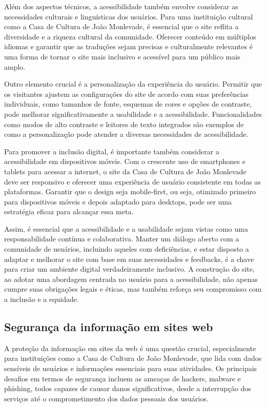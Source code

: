 Além dos aspectos técnicos, a acessibilidade também envolve considerar as necessidades culturais e linguísticas dos usuários. Para uma instituição cultural como a Casa de Cultura de João Monlevade, é essencial que o site reflita a diversidade e a riqueza cultural da comunidade. Oferecer conteúdo em múltiplos idiomas e garantir que as traduções sejam precisas e culturalmente relevantes é uma forma de tornar o site mais inclusivo e acessível para um público mais amplo.

Outro elemento crucial é a personalização da experiência do usuário. Permitir que os visitantes ajustem as configurações do site de acordo com suas preferências individuais, como tamanhos de fonte, esquemas de cores e opções de contraste, pode melhorar significativamente a usabilidade e a acessibilidade. Funcionalidades como modos de alto contraste e leitores de texto integrados são exemplos de como a personalização pode atender a diversas necessidades de acessibilidade.

Para promover a inclusão digital, é importante também considerar a acessibilidade em dispositivos móveis. Com o crescente uso de smartphones e tablets para acessar a internet, o site da Casa de Cultura de João Monlevade deve ser responsivo e oferecer uma experiência de usuário consistente em todas as plataformas. Garantir que o design seja mobile-first, ou seja, otimizado primeiro para dispositivos móveis e depois adaptado para desktops, pode ser uma estratégia eficaz para alcançar essa meta.

Assim, é essencial que a acessibilidade e a usabilidade sejam vistas como uma responsabilidade contínua e colaborativa. Manter um diálogo aberto com a comunidade de usuários, incluindo aqueles com deficiências, e estar disposto a adaptar e melhorar o site com base em suas necessidades e feedbacks, é a chave para criar um ambiente digital verdadeiramente inclusivo. A construção do site, ao adotar uma abordagem centrada no usuário para a acessibilidade, não apenas cumpre suas obrigações legais e éticas, mas também reforça seu compromisso com a inclusão e a equidade.


\subsection{Segurança da informação em sites web}

A proteção da informação em sites da web é uma questão crucial, especialmente para instituições como a Casa de Cultura de João Monlevade, que lida com dados sensíveis de usuários e informações essenciais para suas atividades. Os principais desafios em termos de segurança incluem as ameaças de hackers, malware e phishing, todos capazes de causar danos significativos, desde a interrupção dos serviços até o comprometimento dos dados pessoais dos usuários.

